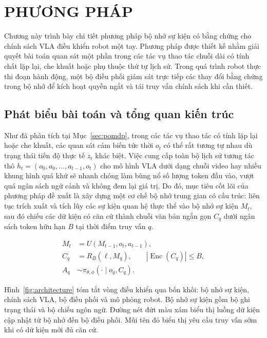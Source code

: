 \chapter{PHƯƠNG PHÁP}

Chương này trình bày chi tiết phương pháp bộ nhớ sự kiện có bằng chứng cho chính sách VLA điều khiển robot một tay. Phương pháp được thiết kế nhằm giải quyết bài toán quan sát một phần trong các tác vụ thao tác chuỗi dài có tính chất lặp lại, che khuất hoặc phụ thuộc thứ tự lịch sử. Trong quá trình robot thực thi đoạn hành động, một bộ điều phối giám sát trực tiếp các thay đổi bằng chứng trong bộ nhớ để kích hoạt quyền ngắt và tái truy vấn chính sách khi cần thiết.

\section{Phát biểu bài toán và tổng quan kiến trúc}

Như đã phân tích tại Mục~\ref{sec:pomdp}, trong các tác vụ thao tác có tính lặp lại hoặc che khuất, các quan sát cảm biến tức thời $o_t$ có thể rất tương tự nhau dù trạng thái tiến độ thực tế $z_t$ khác biệt. Việc cung cấp toàn bộ lịch sử tương tác thô $h_t = (o_0, a_0, \ldots, a_{t-1}, o_t)$ cho mô hình VLA dưới dạng chuỗi video hay nhiều khung hình quá khứ sẽ nhanh chóng làm bùng nổ số lượng token đầu vào, vượt quá ngân sách ngữ cảnh và không đem lại giá trị. Do đó, mục tiêu cốt lõi của phương pháp đề xuất là xây dựng một cơ chế bộ nhớ trung gian có cấu trúc: liên tục trích xuất và tích lũy các sự kiện quan hệ thực thể vào bộ nhớ sự kiện $M_t$, sau đó chiếu các dữ kiện có căn cứ thành chuỗi văn bản ngắn gọn $C_q$ dưới ngân sách token hữu hạn $B$ tại thời điểm truy vấn $q$.

\begin{equation}
\begin{aligned}
M_t &= U(M_{t-1}, o_t, a_{t-1}),\\
C_q &= R_B(\ell, M_q),\qquad |\operatorname{Enc}(C_q)| \le B,\\
A_q &\sim \pi_{\theta,\phi}(\cdot \mid o_q, C_q).
\end{aligned}
\label{eq:core-transforms}
\end{equation}

Hình~\ref{fig:architecture} tóm tắt vòng điều khiển qua bốn khối: bộ nhớ sự kiện, chính sách VLA, bộ điều phối và mô phỏng robot. Bộ nhớ sự kiện gồm bộ ghi trạng thái và bộ chiếu ngôn ngữ. Đường nét đứt màu xám biểu thị luồng dữ kiện cập nhật từ bộ nhớ đến bộ điều phối. Mũi tên đỏ biểu thị yêu cầu truy vấn sớm khi có dữ kiện mới đủ căn cứ.

